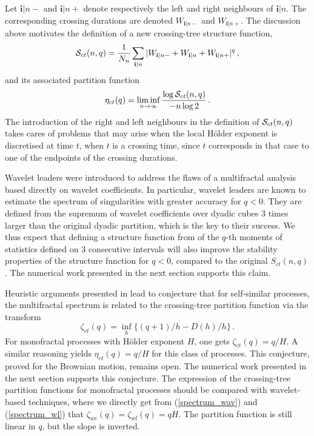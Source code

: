 \documentclass[a4paper]{article}
\newcommand{\bfi}{\mathbf{i}}
\begin{document}
Let $\bfi|n-$ and $\bfi|n+$ denote respectively the left and right neighbours of $\bfi|n$. The corresponding crossing durations are denoted $W_{\bfi|n-}$ and $W_{\bfi|n+}$. 
The discussion above motivates the definition of a new crossing-tree structure function, 
\begin{equation}\label{structure_ct2}
{\cal S}_{ct}(n,q) = \frac{1}{N_n}\sum\limits_{\bfi|n} |W_{\bfi|n-}+ W_{\bfi|n}+W_{\bfi|n+}|^q \,,
\end{equation}
and its associated partition function
\begin{equation}\label{partition_ct2}
\eta_{ct}(q) = \liminf_{n\to \infty}\frac{\log {\cal S}_{ct}(n,q)}{-n \log 2}\,.
\end{equation}
The introduction of the right and left neighbours in the definition of ${\cal S}_{ct}(n,q)$ takes cares of problems that may arise when the local H\"older exponent is discretised at time $t$, when $t$ is a crossing time, since $t$ corresponds in that case to one of the endpoints of the crossing durations.

Wavelet leaders were introduced to address the flaws of a multifractal analysis based directly on wavelet coefficients. In particular, wavelet leaders are known to estimate the spectrum of singularities with greater accuracy for $q<0$. They are defined from the supremum of wavelet coefficients over dyadic cubes 3 times larger than the original dyadic partition, which is the key to their success. 
We thus expect that defining a structure function from of the $q$-th moments of statistics defined on 3 consecutive intervals will also improve the stability properties of the structure function for $q<0$, compared to the original $S_{ct}(n,q)$. 
The numerical work presented in the next section supports this claim.

Heuristic arguments presented in \cite{DecrA15} lead to conjecture that for self-similar processes, the multifractal spectrum is related to the crossing-tree partition function via the transform
\begin{equation}\label{ct_multifractal}
\zeta_{ct}(q) = \inf_h\{ (q+1)/h -D(h)/h \}\,.
\end{equation}
For monofractal processes with H\"older exponent $H$, one gets $\zeta_{ct}(q)=q/H$. 
A similar reasoning yields $\eta_{ct}(q)=q/H$ for this class of processes. 
This conjecture, proved for the Brownian motion, remains open. 
The numerical work presented in the next section supports this conjecture.
The expression of the crossing-tree partition functions for monofractal processes should be compared with wavelet-based techniques, where we directly get from (\ref{spectrum_wav}) and (\ref{spectrum_wl}) that $\zeta_{wc}(q)=\zeta_{wl}(q)=qH$.
The partition function is still linear in $q$, but the slope is inverted. 
\end{document}
